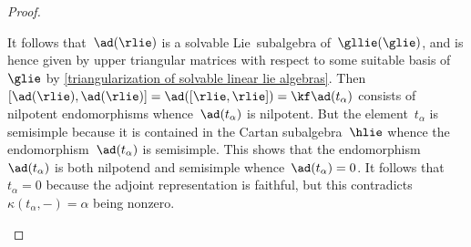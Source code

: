 \begin{proof}
\begin{enumerate}
      It follows that~$\ad(\rlie)$ is a {\threedimensional} solvable Lie~subalgebra of~$\gllie(\glie)$, and is hence given by upper triangular matrices with respect to some suitable basis of~$\glie$ by \cref{triangularization of solvable linear lie algebras}.
      Then~$[\ad(\rlie), \ad(\rlie)] = \ad([\rlie, \rlie]) = \kf \ad(t_\alpha)$ consists of nilpotent endomorphisms whence~$\ad(t_\alpha)$ is nilpotent.
      But the element~$t_\alpha$ is semisimple because it is contained in the Cartan subalgebra~$\hlie$ whence the endomorphism~$\ad(t_\alpha)$ is semisimple.
      This shows that the endomorphism~$\ad(t_\alpha)$ is both nilpotend and semisimple whence~$\ad(t_\alpha) = 0$.
      It follows that~$t_\alpha = 0$ because the adjoint representation is faithful, but this contradicts~$\kappa(t_\alpha, -) = \alpha$ being nonzero.
    \qedhere
  \end{enumerate}
\end{proof}



